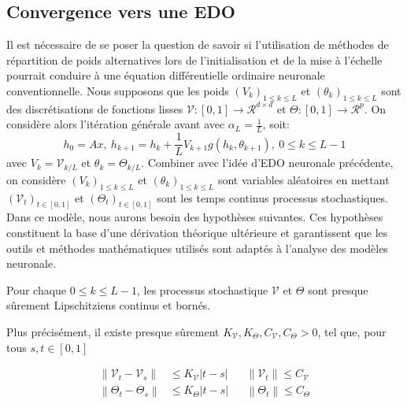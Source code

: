 \subsection{Convergence vers une EDO}
Il est nécessaire de se poser la question de savoir si l'utilisation de méthodes de répartition de poids alternatives lors de l'initialisation et de la mise à l'échelle pourrait conduire à une équation différentielle ordinaire neuronale conventionnelle. Nous supposons que les poids $(V_k)_{1\leqslant k \leqslant L }$ et $(\theta_k)_{1\leqslant k \leqslant L }$ sont des discrétisations de fonctions lisses $\mathcal{V}:[0,1] \to \mathcal{R}^{d \times d}$ et $\Theta:[0,1] \to \mathcal{R}^{p}$. On considère alors l'itération générale avant avec $\alpha_L = \frac{1}{L}$, soit:
\begin{equation}\label{eq13}
    h_0 = Ax,\ h_{k+1} = h_k + \frac{1}{L}V_{k+1}g(h_k,\theta_{k+1}),\ 0 \leqslant k \leqslant L-1
\end{equation}
avec $V_k = \mathcal{V}_{k/L}$ et $\theta_k = \Theta_{k/L}$.
Combiner avec l'idée d'EDO neuronale précédente, on considère $(V_k)_{1\leqslant k \leqslant L }$ et $(\theta_k)_{1\leqslant k \leqslant L }$ sont variables aléatoires en mettant $(\mathcal{V}_t)_{t \in [0,1]}$ et $(\Theta_t)_{t \in [0,1]}$ sont les temps continus processus stochastiques. Dans ce modèle, nous aurons besoin des hypothèses suivantes. Ces hypothèses constituent la base d'une dérivation théorique ultérieure et garantissent que les outils et méthodes mathématiques utilisés sont adaptés à l'analyse des modèles neuronale. 

\begin{assumption}\label{H5}
Pour chaque $0 \leqslant k \leqslant L-1$, les processus stochastique $\mathcal{V}$ et $\Theta$ sont presque sûrement Lipschitziens continus et bornés.
\end{assumption}

Plus précisément, il existe presque sûrement $K_{\mathscr{V}}, K_{\Theta}, C_{\mathscr{V}}, C_{\Theta}>0$, tel que, pour tous $s, t \in [0,1]$

\begin{align*}
    \left\|\mathscr{V}_t-\mathscr{V}_s\right\| &\leqslant K_{\mathscr{V}}|t-s| 
    &&\left\|\mathscr{V}_t\right\| \leqslant C_{\mathscr{V}} \\
    \left\|\Theta_t-\Theta_s\right\| &\leqslant K_{\Theta}|t-s| 
    &&\left\|\Theta_t\right\| \leqslant C_{\Theta}
\end{align*}

